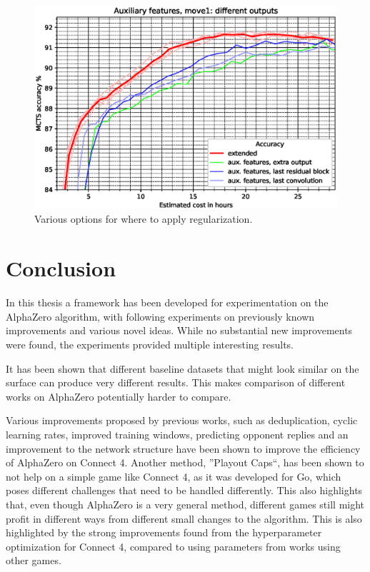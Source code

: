 \documentclass[12pt,onecolumn,oneside,titlepage]{article}
\begin{document}
\begin{figure}[H]
\centering
\includegraphics[clip,width=\columnwidth]{aux_extra_output}
\caption{Various options for where to apply regularization.}
\label{fig:aux_extra_output}
\end{figure}

\pagebreak

\section{Conclusion}

In this thesis a framework has been developed for experimentation on the AlphaZero algorithm, with following experiments on previously known improvements and various novel ideas.
While no substantial new improvements were found, the experiments provided multiple interesting results.

It has been shown that different baseline datasets that might look similar on the surface can produce very different results.
This makes comparison of different works on AlphaZero potentially harder to compare.

Various improvements proposed by previous works, such as deduplication, cyclic learning rates, improved training windows, predicting opponent replies and an 
improvement to the network structure have been shown to improve the efficiency of AlphaZero
on Connect 4. Another method, ''Playout Caps``, has been shown to not help on a simple game like Connect 4, as it was developed for Go, which poses different challenges that need to be handled differently. This also highlights
that, even though AlphaZero is a very general method, different games still might profit in different ways from different small changes to the algorithm. This is also highlighted by the strong improvements found
from the hyperparameter optimization for Connect 4, compared to using parameters from works using other games.
\end{document}
